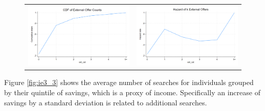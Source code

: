 \documentclass[12pt]{article}
\begin{document}
\begin{figure}[H]
\caption{}
 \label{fig:ie3_2}
\centering{}%
\begin{tabular}{cc}
\includegraphics[scale=0.27]{../figures/IE3_CDF_number_extoffers.png} &\includegraphics[scale=0.27]{../figures/IE3_hazard_number_extoffers.png}
\end{tabular}
\end{figure}



Figure \ref{fig:ie3_3} shows the average number of searches for individuals grouped by their quintile of savings, which is a proxy of income. Specifically an increase of savings by a standard deviation is related to  additional searches. 
\end{document}
